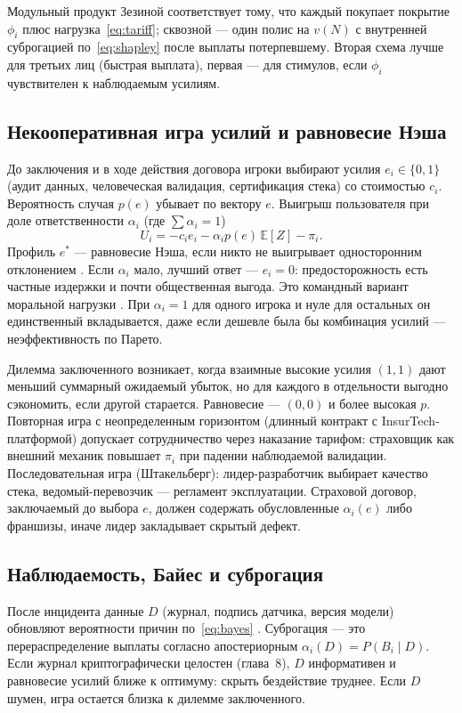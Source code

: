 \documentclass[a4paper,14pt]{extarticle}
\begin{document}
Модульный продукт Зезиной соответствует тому, что каждый покупает покрытие $\phi_i$ плюс нагрузка~\eqref{eq:tariff}; сквозной --- один полис на $v(N)$ с внутренней суброгацией по~\eqref{eq:shapley} после выплаты потерпевшему. Вторая схема лучше для третьих лиц (быстрая выплата), первая --- для стимулов, если $\phi_i$ чувствителен к наблюдаемым усилиям.

\subsection{Некооперативная игра усилий и равновесие Нэша}

До заключения и в ходе действия договора игроки выбирают усилия $e_i\in\{0,1\}$ (аудит данных, человеческая валидация, сертификация стека) со стоимостью $c_i$. Вероятность случая $p(e)$ убывает по вектору $e$. Выигрыш пользователя при доле ответственности $\alpha_i$ (где $\sum\alpha_i=1$)
\[
U_i=-c_i e_i-\alpha_i p(e)\,\mathbb{E}[Z]-\pi_i.
\]
Профиль $e^*$ --- равновесие Нэша, если никто не выигрывает односторонним отклонением \cite{pindyck}. Если $\alpha_i$ мало, лучший ответ --- $e_i=0$: предосторожность есть частные издержки и почти общественная выгода. Это командный вариант моральной нагрузки \cite{pindyck}. При $\alpha_i=1$ для одного игрока и нуле для остальных он единственный вкладывается, даже если дешевле была бы комбинация усилий --- неэффективность по Парето.

Дилемма заключенного возникает, когда взаимные высокие усилия $(1,1)$ дают меньший суммарный ожидаемый убыток, но для каждого в отдельности выгодно сэкономить, если другой старается. Равновесие --- $(0,0)$ и более высокая $p$. Повторная игра с неопределенным горизонтом (длинный контракт с InsurTech-платформой) допускает сотрудничество через наказание тарифом: страховщик как внешний механик повышает $\pi_i$ при падении наблюдаемой валидации. Последовательная игра (Штакельберг): лидер-разработчик выбирает качество стека, ведомый-перевозчик --- регламент эксплуатации. Страховой договор, заключаемый до выбора $e$, должен содержать обусловленные $\alpha_i(e)$ либо франшизы, иначе лидер закладывает скрытый дефект.

\subsection{Наблюдаемость, Байес и суброгация}

После инцидента данные $D$ (журнал, подпись датчика, версия модели) обновляют вероятности причин по~\eqref{eq:bayes} \cite{shvedov}. Суброгация --- это перераспределение выплаты согласно апостериорным $\alpha_i(D)=P(B_i\mid D)$. Если журнал криптографически целостен (глава~8), $D$ информативен и равновесие усилий ближе к оптимуму: скрыть бездействие труднее. Если $D$ шумен, игра остается близка к дилемме заключенного.
\end{document}
